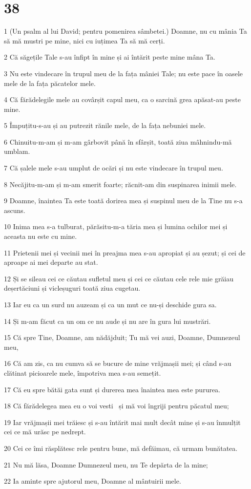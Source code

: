 \chapter{38}

\par 1 (Un psalm al lui David; pentru pomenirea sâmbetei.) Doamne, nu cu mânia Ta să mă mustri pe mine, nici cu iuțimea Ta să mă cerți.
\par 2 Că săgețile Tale s-au înfipt în mine și ai întărit peste mine mâna Ta.
\par 3 Nu este vindecare în trupul meu de la fața mâniei Tale; nu este pace în oasele mele de la fața păcatelor mele.
\par 4 Că fărădelegile mele au covârșit capul meu, ca o sarcină grea apăsat-au peste mine.
\par 5 Împuțitu-s-au și au putrezit rănile mele, de la fața nebuniei mele.
\par 6 Chinuitu-m-am și m-am gârbovit până în sfârșit, toată ziua mâhnindu-mă umblam.
\par 7 Că șalele mele s-au umplut de ocări și nu este vindecare în trupul meu.
\par 8 Necăjitu-m-am și m-am smerit foarte; răcnit-am din suspinarea inimii mele.
\par 9 Doamne, înaintea Ta este toată dorirea mea și suspinul meu de la Tine nu s-a ascuns.
\par 10 Inima mea s-a tulburat, părăsitu-m-a tăria mea și lumina ochilor mei și aceasta nu este cu mine.
\par 11 Prietenii mei și vecinii mei în preajma mea s-au apropiat și au șezut; și cei de aproape ai mei departe au stat.
\par 12 Și se sileau cei ce căutau sufletul meu și cei ce căutau cele rele mie grăiau deșertăciuni și vicleșuguri toată ziua cugetau.
\par 13 Iar eu ca un surd nu auzeam și ca un mut ce nu-și deschide gura sa.
\par 14 Și m-am făcut ca un om ce nu aude și nu are în gura lui mustrări.
\par 15 Că spre Tine, Doamne, am nădăjduit; Tu mă vei auzi, Doamne, Dumnezeul meu,
\par 16 Că am zis, ca nu cumva să se bucure de mine vrăjmașii mei; și când s-au clătinat picioarele mele, împotriva mea s-au semețit.
\par 17 Că eu spre bătăi gata sunt și durerea mea înaintea mea este pururea.
\par 18 Că fărădelegea mea eu o voi vesti  și mă voi îngriji pentru păcatul meu;
\par 19 Iar vrăjmașii mei trăiesc și s-au întărit mai mult decât mine și s-au înmulțit cei ce mă urăsc pe nedrept.
\par 20 Cei ce îmi răsplătesc rele pentru bune, mă defăimau, că urmam bunătatea.
\par 21 Nu mă lăsa, Doamne Dumnezeul meu, nu Te depărta de la mine;
\par 22 Ia aminte spre ajutorul meu, Doamne al mântuirii mele.

